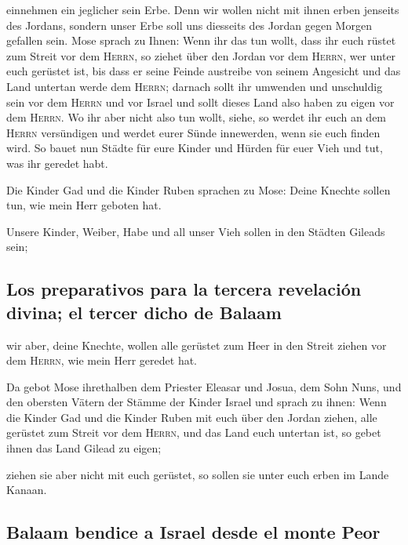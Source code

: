 einnehmen ein jeglicher sein Erbe.  Denn wir wollen nicht
mit ihnen erben jenseits des Jordans, sondern unser Erbe soll uns
diesseits des Jordan gegen Morgen gefallen sein.  Mose
sprach zu Ihnen: Wenn ihr das tun wollt, dass ihr euch rüstet zum Streit
vor dem \textsc{Herrn},  so ziehet über den Jordan vor
dem \textsc{Herrn}, wer unter euch gerüstet ist, bis dass er seine
Feinde austreibe von seinem Angesicht  und das Land
untertan werde dem \textsc{Herrn}; darnach sollt ihr umwenden und
unschuldig sein vor dem \textsc{Herrn} und vor Israel und sollt dieses
Land also haben zu eigen vor dem \textsc{Herrn}.  Wo ihr
aber nicht also tun wollt, siehe, so werdet ihr euch an dem
\textsc{Herrn} versündigen und werdet eurer Sünde innewerden, wenn sie
euch finden wird.  So bauet nun Städte für eure Kinder
und Hürden für euer Vieh und tut, was ihr geredet habt.

 Die Kinder Gad und die Kinder Ruben sprachen zu Mose:
Deine Knechte sollen tun, wie mein Herr geboten hat.

 Unsere Kinder, Weiber, Habe und all unser Vieh sollen in
den Städten Gileads sein;

\hypertarget{los-preparativos-para-la-tercera-revelaciuxf3n-divina-el-tercer-dicho-de-balaam}{%
\subsection{Los preparativos para la tercera revelación divina; el
tercer dicho de
Balaam}\label{los-preparativos-para-la-tercera-revelaciuxf3n-divina-el-tercer-dicho-de-balaam}}

 wir aber, deine Knechte, wollen alle gerüstet zum Heer
in den Streit ziehen vor dem \textsc{Herrn}, wie mein Herr geredet hat.

 Da gebot Mose ihrethalben dem Priester Eleasar und
Josua, dem Sohn Nuns, und den obersten Vätern der Stämme der Kinder
Israel  und sprach zu ihnen: Wenn die Kinder Gad und die
Kinder Ruben mit euch über den Jordan ziehen, alle gerüstet zum Streit
vor dem \textsc{Herrn}, und das Land euch untertan ist, so gebet ihnen
das Land Gilead zu eigen;

 ziehen sie aber nicht mit euch gerüstet, so sollen sie
unter euch erben im Lande Kanaan.

\hypertarget{balaam-bendice-a-israel-desde-el-monte-peor}{%
\subsection{Balaam bendice a Israel desde el monte
Peor}\label{balaam-bendice-a-israel-desde-el-monte-peor}}

